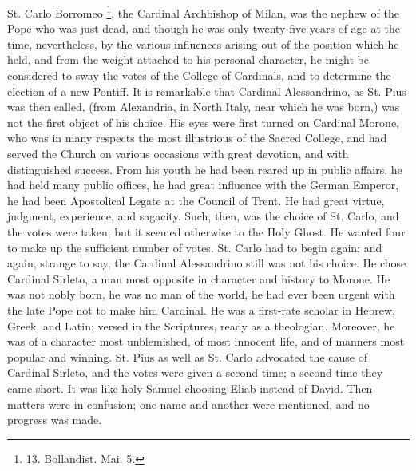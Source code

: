 St. Carlo Borromeo \footnote{13.
Bollandist. Mai. 5.}, the Cardinal Archbishop of Milan, was the nephew of the Pope
who was just dead, and though he was only twenty-five years of age at
the time, nevertheless, by the various influences arising out of the
position which he held, and from the weight attached to his personal
character, he might be considered to sway the votes of the College of
Cardinals, and to determine the election of a new Pontiff. It is
remarkable that Cardinal Alessandrino, as St. Pius was then called,
(from Alexandria, in North Italy, near which he was born,) was not the
first object of his choice. His eyes were first turned on Cardinal
Morone, who was in many respects the most illustrious of the Sacred
College, and had served the Church on various occasions with great
devotion, and with distinguished success. From his youth he had been
reared up in public affairs, he had held many public offices, he had
great influence with the German Emperor, he had been Apostolical
Legate at the Council of Trent. He had great virtue, judgment,
experience, and sagacity. Such, then, was the choice of St. Carlo, and
the votes were taken; but it seemed otherwise to the Holy Ghost. He
wanted four to make up the sufficient number of votes. St. Carlo
had to begin again; and again, strange to say, the Cardinal
Alessandrino still was not his choice. He chose Cardinal Sirleto, a
man most opposite in character and history to Morone. He was not nobly
born, he was no man of the world, he had ever been urgent with the
late Pope not to make him Cardinal. He was a first-rate scholar in
Hebrew, Greek, and Latin; versed in the Scriptures, ready as a
theologian. Moreover, he was of a character most unblemished, of most
innocent life, and of manners most popular and winning. St. Pius as
well as St. Carlo advocated the cause of Cardinal Sirleto, and the
votes were given a second time; a second time they came short. It was
like holy Samuel choosing Eliab instead of David. Then matters were in
confusion; one name and another were mentioned, and no progress was
made.

